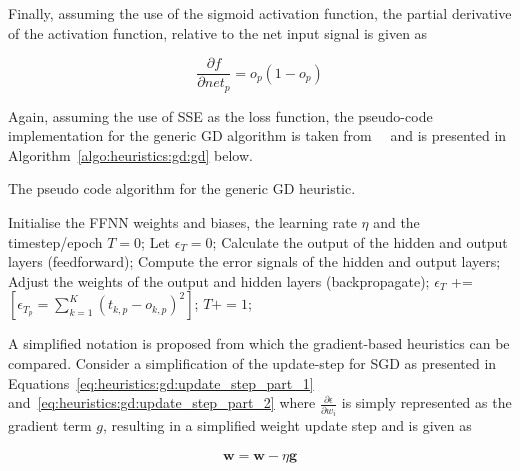 Finally, assuming the use of the sigmoid activation function, the partial derivative of the activation function, relative to the net input signal is given as

\begin{equation}
      \label{eq:heuristics:gd:update_step_part_4}
      \frac{\partial f}{\partial net_{p}} = o_p(1 - o_{p})
\end{equation}

Again, assuming the use of \acs{SSE} as the loss function, the pseudo-code implementation for the generic \acs{GD} algorithm is taken from~\citeauthor{ref:engelbrecht:2007}~\cite{ref:engelbrecht:2007} and is presented in Algorithm~\ref{algo:heuristics:gd:gd} below.

\begin{algorithm}[H]
      \caption{The pseudo code algorithm for the generic \acf{GD} heuristic.}
      \label{algo:heuristics:gd:gd}
      \begin{algorithmic}
            \State Initialise the \acs{FFNN} weights and biases, the learning rate $\eta$ and the timestep/epoch $T=0$;
            \State Let $\epsilon_{T} = 0$;
            \State Calculate the output of the hidden and output layers (feedforward);
            \State Compute the error signals of the hidden and output layers;
            \State Adjust the weights of the output and hidden layers (backpropagate);
            \State $\epsilon_{T}$ += $[\epsilon_{T_{p}} = \sum^{K}_{k=1}(t_{k,p} - o_{k,p})^{2}]$;
            \EndFor
            \State $T += 1$;
            \EndWhile
      \end{algorithmic}
\end{algorithm}

A simplified notation is proposed from which the gradient-based heuristics can be compared. Consider a simplification of the update-step for \acs{SGD} as presented in Equations~\eqref{eq:heuristics:gd:update_step_part_1} and~\eqref{eq:heuristics:gd:update_step_part_2} where $\frac{\partial \epsilon}{\partial w_{i}}$ is simply represented as the gradient term $g$, resulting in a simplified weight update step and is given as

\begin{equation}
      \label{eq:heuristics:gd:sgd}
      \begin{split}
            \boldsymbol{w} = \boldsymbol{w} - \eta \boldsymbol{g}
      \end{split}
\end{equation}

